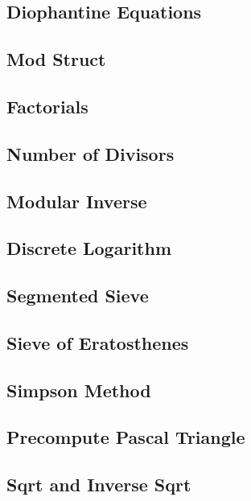 \documentclass[10pt,letterpaper,landscape,twocolumn]{article}
\begin{document}
\subsection{Diophantine Equations}

\subsection{Mod Struct}

\subsection{Factorials}

\subsection{Number of Divisors}

\subsection{Modular Inverse}

\subsection{Discrete Logarithm}

\subsection{Segmented Sieve}

\subsection{Sieve of Eratosthenes}

\subsection{Simpson Method}

\subsection{Precompute Pascal Triangle}

\subsection{Sqrt and Inverse Sqrt}

\end{document}
